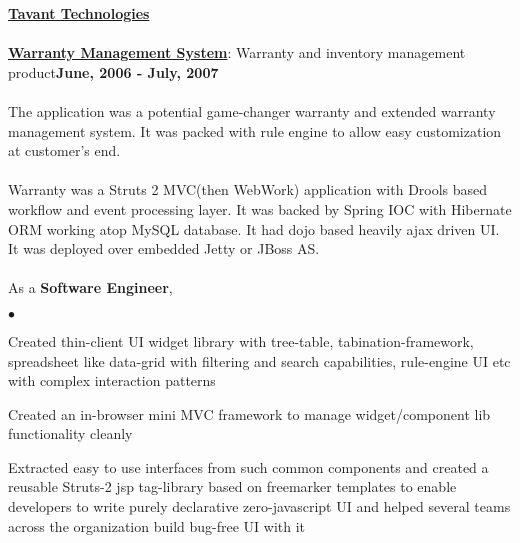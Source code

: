 \documentclass[margin,line]{res}
\newenvironment{list2}{
  \begin{list}{$\bullet$}{%
      \setlength{\itemsep}{0in}
      \setlength{\parsep}{0in} \setlength{\parskip}{0in}
      \setlength{\topsep}{0in} \setlength{\partopsep}{0in} 
      \setlength{\leftmargin}{0.2in}}}{\end{list}}
\begin{document}
\begin{resume}
{\underline {\bf Tavant Technologies}}\\
\\
\href{http://www.tavant.com/warranty-management}{\bf Warranty Management System}: Warranty and inventory management product\hfill {\bf June, 2006 - July, 2007}\\
\vspace{-.2cm}\\
The application was a potential game-changer warranty and extended warranty management system. It was packed with rule engine to allow easy customization at customer's end.\\
\\
Warranty was a Struts 2 MVC(then WebWork) application with Drools based workflow and event processing layer. It was backed by Spring IOC with Hibernate ORM working atop MySQL database. It had dojo based heavily ajax driven UI. It was deployed over embedded Jetty or JBoss AS.\\
\\
As a {\bf Software Engineer},
\begin{list2}
\item Created thin-client UI widget library with tree-table, tabination-framework, spreadsheet like data-grid with filtering and search capabilities, rule-engine UI etc with complex interaction patterns
\item Created an in-browser mini MVC framework to manage widget/component lib functionality cleanly
\item Extracted easy to use interfaces from such common components and created a reusable Struts-2 jsp tag-library based on freemarker templates to enable developers to write purely declarative zero-javascript UI and helped several teams across the organization build bug-free UI with it
\end{list2}


\end{resume}
\end{document}
